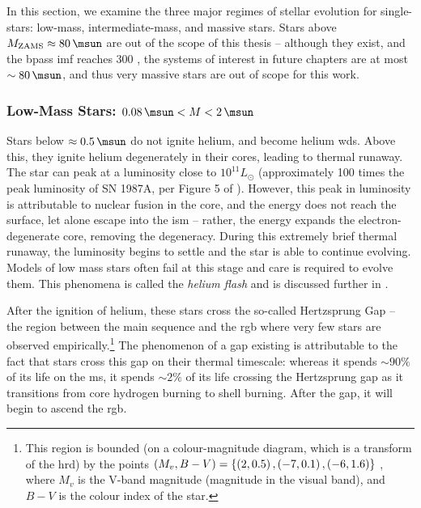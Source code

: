 In this section, we examine the three major regimes of stellar evolution for single-stars: low-mass, intermediate-mass, and massive stars. Stars above $M_\text{ZAMS}\approx\SI{80}{\msun}$ are out of the scope of this thesis -- although they exist, and the \gls{bpass} \gls{imf} reaches \SI{300}{\msun} \citep{Eldridge:2017}, the systems of interest in future chapters are at most $\sim\SI{80}{\msun}$, and thus very massive stars are out of scope for this work.

\subsubsection{Low-Mass Stars: \texorpdfstring{$\SI{0.08}{\msun} < M < \SI{2}{\msun}$}{Stars with between 0.08 and 2 times the mass of the sun}}\label{sec:low_mass_stars}

Stars below $\approx\SI{0.5}{\msun}$ do not ignite helium, and become helium \glspl{wd}. Above this, they ignite helium degenerately in their cores, leading to thermal runaway. The star can peak at a luminosity close to $10^{11} L_\odot$ (approximately 100 times the peak luminosity of SN 1987A, per Figure 5 of \citet{Arnett:1989}). However, this peak in luminosity is attributable to nuclear fusion in the core, and the energy does not reach the surface, let alone escape into the \gls{ism} -- rather, the energy expands the electron-degenerate core, removing the degeneracy. During this extremely brief thermal runaway, the luminosity begins to settle and the star is able to continue evolving. Models of low mass stars often fail at this stage and care is required to evolve them. This phenomena is called the \textit{helium flash} and is discussed further in .

After the ignition of helium, these stars cross the so-called Hertzsprung Gap -- the region between the main sequence and the \gls{rgb} where very few stars are observed empirically.\footnote{This region is bounded (on a colour-magnitude diagram, which is a transform of the \acrlong{hrd}) by the points $\left(M_v, B-V\right)=\left\{\left(2,0.5\right), \left(-7, 0.1\right), \left(-6, 1.6\right)\right\}$ \citep{Hoyle:1960}, where $M_v$ is the V-band magnitude (magnitude in the visual band), and $B-V$ is the colour index of the star.} The phenomenon of a gap existing is attributable to the fact that stars cross this gap on their thermal timescale: whereas it spends $\sim90\%$ of its life on the \gls{ms}, it spends $\sim2\%$ of its life crossing the Hertzsprung gap \citep{Hoyle:1960} as it transitions from core hydrogen burning to shell burning. After the gap, it will begin to ascend the \gls{rgb}.

